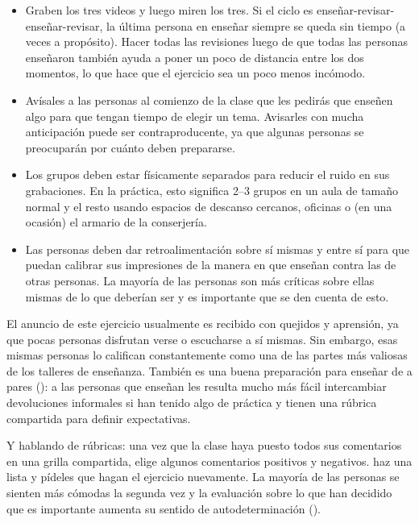 \begin{itemize}

\item
  Graben los tres videos y luego miren los tres.
  Si el ciclo es enseñar-revisar-enseñar-revisar,
  la última persona en enseñar siempre se queda sin tiempo
  (a veces a propósito).
  Hacer todas las revisiones luego de que todas las personas enseñaron
  también ayuda a poner un poco de distancia entre los dos momentos,
  lo que hace que el ejercicio sea un poco menos incómodo.

\item
  Avísales a las personas al comienzo de la clase que les pedirás que enseñen algo
  para que tengan tiempo de elegir un tema.
  Avisarles con mucha anticipación puede ser contraproducente,
  ya que algunas personas se preocuparán por cuánto deben prepararse.

\item
  Los grupos deben estar físicamente separados para reducir el ruido en sus grabaciones.
  En la práctica,
  esto significa 2--3 grupos en un aula de tamaño normal
  y el resto usando espacios de descanso cercanos, oficinas
  o (en una ocasión) el armario de la conserjería.

\item
  Las personas deben dar retroalimentación sobre sí mismas y entre sí
  para que puedan calibrar sus impresiones de la manera en que enseñan
  contra las de otras personas.
  La mayoría de las personas son más críticas sobre ellas mismas de lo que deberían ser
  y es importante que se den cuenta de esto.

\end{itemize}

El anuncio de este ejercicio usualmente es recibido con quejidos y aprensión,
ya que pocas personas disfrutan verse o escucharse a sí mismas.
Sin embargo,
esas mismas personas lo califican constantemente como una de las partes más valiosas de los talleres de enseñanza.
También es una buena preparación para enseñar de a pares (): 
a las personas que enseñan les resulta mucho más fácil intercambiar devoluciones informales
si han tenido algo de práctica
y tienen una rúbrica compartida para definir expectativas.

Y hablando de rúbricas:
una vez que la clase haya puesto todos sus comentarios en una grilla compartida,
elige algunos comentarios positivos y negativos.
haz una lista
y pídeles que hagan el ejercicio nuevamente.
La mayoría de las personas se sienten más cómodas la segunda vez
y la evaluación sobre lo que han decidido que es importante aumenta su sentido de autodeterminación ().

